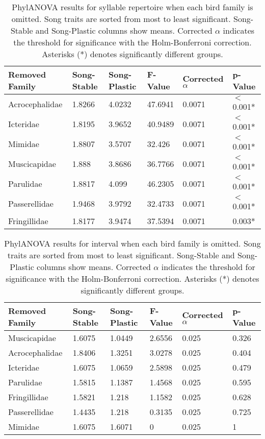 \documentclass[a4paper,12pt]{article}
\begin{document}
\begin{table}[ht]
\caption{PhylANOVA results for syllable repertoire when each bird family is omitted. Song traits are sorted from most to least significant. Song-Stable and Song-Plastic columns show means. Corrected $\alpha$ indicates the threshold for significance with the Holm-Bonferroni correction. Asterisks (*) denotes significantly different groups.}
\centering
\begin{tabular}{llllll}
  \hline
Removed Family & Song-Stable & Song-Plastic & F-Value & Corrected $\alpha$ & p-Value \\ 
  \hline
Acrocephalidae & 1.8266 & 4.0232 & 47.6941 & 0.0071 & $<$0.001* \\ 
  Icteridae & 1.8195 & 3.9652 & 40.9489 & 0.0071 & $<$0.001* \\ 
  Mimidae & 1.8807 & 3.5707 & 32.426 & 0.0071 & $<$0.001* \\ 
  Muscicapidae & 1.888 & 3.8686 & 36.7766 & 0.0071 & $<$0.001* \\ 
  Parulidae & 1.8817 & 4.099 & 46.2305 & 0.0071 & $<$0.001* \\ 
  Passerellidae & 1.9468 & 3.9792 & 32.4733 & 0.0071 & $<$0.001* \\ 
  Fringillidae & 1.8177 & 3.9474 & 37.5394 & 0.0071 & 0.003* \\ 
   \hline
\end{tabular}
\end{table}

\begin{table}[ht]
\caption{PhylANOVA results for interval when each bird family is omitted. Song traits are sorted from most to least significant. Song-Stable and Song-Plastic columns show means. Corrected $\alpha$ indicates the threshold for significance with the Holm-Bonferroni correction. Asterisks (*) denotes significantly different groups.}
\centering
\begin{tabular}{llllll}
  \hline
Removed Family & Song-Stable & Song-Plastic & F-Value & Corrected $\alpha$ & p-Value \\ 
  \hline
Muscicapidae & 1.6075 & 1.0449 & 2.6556 & 0.025 & 0.326 \\ 
  Acrocephalidae & 1.8406 & 1.3251 & 3.0278 & 0.025 & 0.404 \\ 
  Icteridae & 1.6075 & 1.0659 & 2.5898 & 0.025 & 0.479 \\ 
  Parulidae & 1.5815 & 1.1387 & 1.4568 & 0.025 & 0.595 \\ 
  Fringillidae & 1.5821 & 1.218 & 1.1582 & 0.025 & 0.628 \\ 
  Passerellidae & 1.4435 & 1.218 & 0.3135 & 0.025 & 0.725 \\ 
  Mimidae & 1.6075 & 1.6071 & 0 & 0.025 & 1 \\ 
   \hline
\end{tabular}
\end{table}
\end{document}
